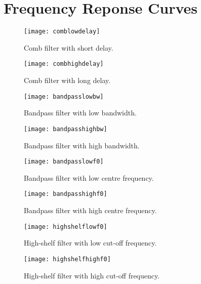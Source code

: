 \chapter{Frequency Reponse Curves}\label{ch:appBfrequencyresponse}

\begin{figure}[!h] 
\centering
\texttt{[image: comblowdelay]}
\caption{\label{fig:comblowdelay} Comb filter with short delay.}
\end{figure}

\begin{figure}[!h] 
\centering
\texttt{[image: combhighdelay]}
\caption{\label{fig:combhighdelay} Comb filter with long delay.}
\end{figure}

\begin{figure}[!h] 
\centering
\texttt{[image: bandpasslowbw]}
\caption{\label{fig:bandpasslowbw} Bandpass filter with low bandwidth.}
\end{figure}

\begin{figure}[!h] 
\centering
\texttt{[image: bandpasshighbw]}
\caption{\label{fig:bandpasshighbw} Bandpass filter with high bandwidth.}
\end{figure}

\begin{figure}[!h] 
\centering
\texttt{[image: bandpasslowf0]}
\caption{\label{fig:bandpasslowf0} Bandpass filter with low centre frequency.}
\end{figure}

\begin{figure}[!h] 
\centering
\texttt{[image: bandpasshighf0]}
\caption{\label{fig:bandpasshighf0} Bandpass filter with high centre frequency.}
\end{figure}

\begin{figure}[!h] 
\centering
\texttt{[image: highshelflowf0]}
\caption{\label{fig:highshelflowf0} High-shelf filter with low cut-off frequency.}
\end{figure}

\begin{figure}[!h] 
\centering
\texttt{[image: highshelfhighf0]}
\caption{\label{fig:highshelhighf0} High-shelf filter with high cut-off frequency.}
\end{figure}

